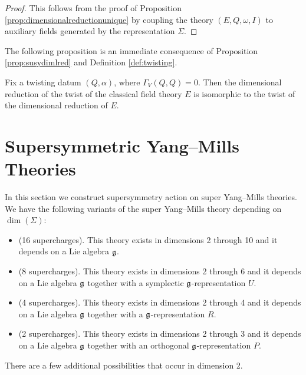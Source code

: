 \documentclass[10pt, oneside]{article}
\begin{document}
\begin{proof}
This follows from the proof of Proposition \ref{prop:dimensionalreductionunique} by coupling the theory $(E, Q, \omega, I)$ to auxiliary fields generated by the representation $\Sigma$.
\end{proof}

The following proposition is an immediate consequence of Proposition \ref{prop:susydimlred} and Definition \ref{def:twisting}.

\begin{prop}
Fix a twisting datum $(Q, \alpha)$, where $\Gamma_V(Q, Q) = 0$. Then the dimensional reduction of the twist of the classical field theory $E$ is isomorphic to the twist of the dimensional reduction of $E$.
\label{prop:twistdimensionalreduction}
\end{prop}

\section{Supersymmetric Yang--Mills Theories} \label{sect:SYM}

In this section we construct supersymmetry action on super Yang--Mills theories. We have the following variants of the super Yang--Mills theory depending on $\dim(\Sigma)$:
\begin{itemize}
\item (16 supercharges). This theory exists in dimensions 2 through 10 and it depends on a Lie algebra $\mathfrak g$.

\item (8 supercharges). This theory exists in dimensions 2 through 6 and it depends on a Lie algebra $\mathfrak g$ together with a symplectic $\mathfrak g$-representation $U$.

\item (4 supercharges). This theory exists in dimensions 2 through 4 and it depends on a Lie algebra $\mathfrak g$ together with a $\mathfrak g$-representation $R$.

\item (2 supercharges). This theory exists in dimensions 2 through 3 and it depends on a Lie algebra $\mathfrak g$ together with an orthogonal $\mathfrak g$-representation $P$.
\end{itemize}

There are a few additional possibilities that occur in dimension 2.
\end{document}
